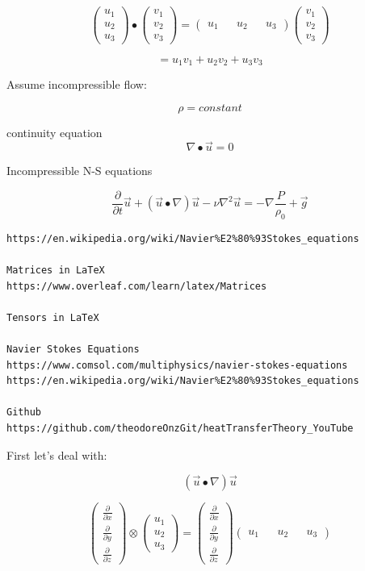 \documentclass[11pt]{article}
\begin{document}
$$ \begin{pmatrix}
u_1 \\
u_2 \\
u_3 
\end{pmatrix} \bullet \begin{pmatrix}
v_1 \\
v_2 \\
v_3 
\end{pmatrix}
=
\begin{pmatrix}
u_1 && u_2 && u_3
\end{pmatrix} \begin{pmatrix}
v_1 \\
v_2 \\
v_3 
\end{pmatrix} $$

$$= u_1 v_1 + u_2 v_2 + u_3 v_3 $$

Assume incompressible flow:

$$\rho=constant$$

continuity equation
$$\nabla \bullet \vec{u}=0$$


Incompressible N-S equations

$$\frac{\partial }{\partial t}\vec{u} +(\vec{u}\bullet \nabla) \vec{u} - \nu \nabla^2 \vec{u} = - \nabla \frac{P}{\rho_0} +\vec{g}$$

\begin{verbatim}
https://en.wikipedia.org/wiki/Navier%E2%80%93Stokes_equations

Matrices in LaTeX
https://www.overleaf.com/learn/latex/Matrices

Tensors in LaTeX

Navier Stokes Equations
https://www.comsol.com/multiphysics/navier-stokes-equations
https://en.wikipedia.org/wiki/Navier%E2%80%93Stokes_equations

Github
https://github.com/theodoreOnzGit/heatTransferTheory_YouTube
\end{verbatim}

First let's deal with:

$$(\vec{u}\bullet \nabla) \vec{u}$$

\begin{equation}
\begin{pmatrix}
\frac{\partial}{\partial x} \\ 
\frac{\partial}{\partial y} \\
\frac{\partial}{\partial z} 
\end{pmatrix} \otimes  \begin{pmatrix}
u_1 \\
u_2 \\
u_3
\end{pmatrix} 
= 
\begin{pmatrix}
\frac{\partial}{\partial x} \\ 
\frac{\partial}{\partial y} \\
\frac{\partial}{\partial z} 
\end{pmatrix}  \begin{pmatrix}
u_1 && u_2 && u_3
\end{pmatrix} 
\end{equation}
\end{document}
